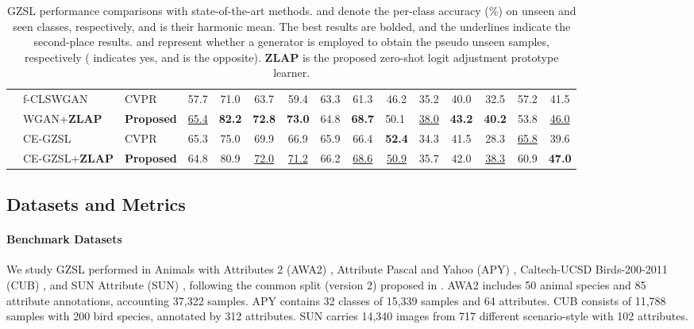 \documentclass{article}
\begin{document}
\begin{table*}[t]
{\begin{tabular}{@{}cllcccccccccccc}
\noalign{\smallskip}
\cline{2-15}
\noalign{\smallskip}
  \multicolumn{1}{c|}{}             & f-CLSWGAN               & CVPR \cite{xian2018feature}             & 57.7 & 71.0 & 63.7            & 59.4          & 63.3         & 61.3         & 46.2          & 35.2          & 40.0          & 32.5             & 57.2             & 41.5             \\
	\multicolumn{1}{c|}{}			&WGAN+{\bf ZLAP}                & {\bf Proposed}                    & \underline{65.4} & {\bf82.2} & {\bf72.8}                  & \multicolumn{1}{l}{{\bf 73.0}} & 64.8                 & {\bf 68.7}                  & \multicolumn{1}{l}{50.1} & \underline{38.0}                  &{\bf 43.2}                  & \multicolumn{1}{l}{{\bf 40.2}} & 53.8                  &\underline{ 46.0}                 \\
    \noalign{\smallskip}
\cline{2-15}
\noalign{\smallskip}
    \multicolumn{1}{c|}{}            &CE-GZSL                 & CVPR \cite{han2021contrastive}     & 65.3          & 75.0         & 69.9          & 66.9    & 65.9          & 66.4          & {\bf 52.4}          & 34.3          & 41.5          & 28.3            & \underline{65.8}             &39.6             \\
     \multicolumn{1}{c|}{}           &CE-GZSL+{\bf ZLAP}    &{\bf Proposed}   &64.8 &80.9 &\underline{72.0}   &\underline{71.2} &66.2 &\underline{68.6} &\underline{50.9}&35.7&42.0   &\underline{38.3} &60.9 &{\bf47.0}\\
				\bottomrule
			\end{tabular}
		}
		\caption{GZSL performance comparisons with state-of-the-art methods.  and  denote the per-class accuracy (\%) on unseen and seen classes, respectively, and  is their harmonic mean. The best results are bolded, and the underlines indicate the second-place results.  and  represent whether a generator is employed to obtain the pseudo unseen samples, respectively ( indicates yes, and  is the opposite). {\bf ZLAP} is the proposed zero-shot logit adjustment prototype learner.}
        \vspace{-2ex}
		\label{tab2}
	\end{table*}
	\subsection{Datasets and Metrics}
\label{metric}
\paragraph{Benchmark Datasets}
We study GZSL performed in Animals with Attributes 2 (AWA2) \cite{lampert2013attribute}, Attribute Pascal and Yahoo (APY) \cite{farhadi2009describing}, Caltech-UCSD Birds-200-2011 (CUB) \cite{wah2011caltech}, and SUN Attribute (SUN) \cite{patterson2012sun}, following the common split (version 2) proposed in \cite{xian2017zero}. AWA2 includes 50 animal species and 85 attribute annotations, accounting 37,322 samples. APY contains 32 classes of 15,339 samples and 64 attributes. CUB consists of 11,788 samples with 200 bird species, annotated by 312 attributes. SUN carries 14,340 images from 717 different scenario-style with 102 attributes.
	
\end{document}
